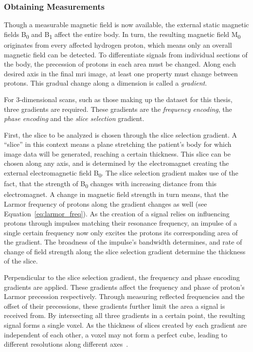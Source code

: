 \subsubsection{Obtaining Measurements}

Though a measurable magnetic field is now available, the external static 
magnetic fields B\textsubscript{0} and B\textsubscript{1} affect the entire body. In turn,
the resulting magnetic field M\textsubscript{0} originates from every affected hydrogen 
proton, which means only an overall magnetic field can be detected. To 
differentiate signals from individual sections of the body, the precession of 
protons in each area must be changed. Along each desired axis in the final 
\ac{mri} image, at least one property must change between protons. This gradual
change along a dimension is called a \textit{gradient}. 

For 3-dimensional scans, such as those making up the dataset for this thesis, 
three gradients are required. These gradients are the 
\textit{frequency encoding}, the \textit{phase encoding} and the \textit{slice
selection} gradient. 

First, the slice to be analyzed is chosen through the slice selection gradient. 
A \enquote{slice} in this context means a plane stretching the patient's body 
for which image data will be generated, reaching a certain thickness. This slice
can be chosen along any axis, and is determined by the electromagnet creating
the external electromagnetic field B\textsubscript{0}. The slice
selection gradient makes use of the fact, that the strength of B\textsubscript{0} changes
with increasing distance from this electromagnet. A change in 
magnetic field strength in turn means, that the Larmor frequency of protons 
along the gradient changes as well (see Equation~\ref{eq:larmor_freq}). As
the creation of a signal relies on influencing protons through impulses matching
their resonance frequency, an impulse of a single certain frequency now only 
excites the protons its corresponding area of the gradient. The broadness of the 
impulse's bandwidth determines, and rate of change of field strength along the 
slice selection gradient determine the thickness of the slice. 

Perpendicular to the slice selection gradient, the frequency and phase encoding
gradients are applied. These gradients affect the frequency and phase of 
proton's Larmor precession respectively. Through measuring reflected frequencies
and the offset of their precessions, these gradients further limit the area a 
signal is received from. By intersecting all three gradients in a certain point,
the resulting signal forms a single voxel. As the thickness of slices created by
each gradient are independent of each other, a voxel may not form a perfect cube,
leading to different resolutions along different axes~\cite{medical_imaging,introduction_to_particle_physics,mri_the_basics}. 


